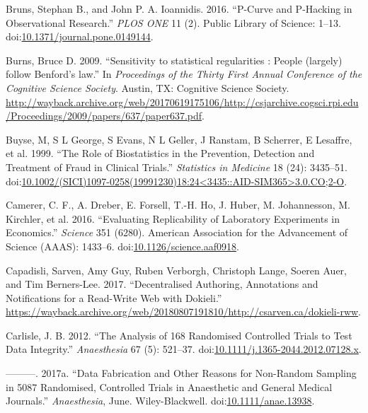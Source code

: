 \documentclass[a5paper]{book}
\begin{document}
\hypertarget{ref-doi:10.1371ux2fjournal.pone.0149144}{}
Bruns, Stephan B., and John P. A. Ioannidis. 2016. ``P-Curve and
P-Hacking in Observational Research.'' \emph{PLOS ONE} 11 (2). Public
Library of Science: 1--13.
doi:\href{https://doi.org/10.1371/journal.pone.0149144}{10.1371/journal.pone.0149144}.

\hypertarget{ref-Burns2009}{}
Burns, Bruce D. 2009. ``Sensitivity to statistical regularities : People
(largely) follow Benford's law.'' In \emph{Proceedings of the Thirty
First Annual Conference of the Cognitive Science Society}. Austin, TX:
Cognitive Science Society.
\url{http://wayback.archive.org/web/20170619175106/http://csjarchive.cogsci.rpi.edu/Proceedings/2009/papers/637/paper637.pdf}.

\hypertarget{ref-buyse1999}{}
Buyse, M, S L George, S Evans, N L Geller, J Ranstam, B Scherrer, E
Lesaffre, et al. 1999. ``The Role of Biostatistics in the Prevention,
Detection and Treatment of Fraud in Clinical Trials.'' \emph{Statistics
in Medicine} 18 (24): 3435--51.
doi:\href{https://doi.org/10.1002/(SICI)1097-0258(19991230)18:24\%3C3435::AID-SIM365\%3E3.0.CO;2-O}{10.1002/(SICI)1097-0258(19991230)18:24\textless{}3435::AID-SIM365\textgreater{}3.0.CO;2-O}.

\hypertarget{ref-doi:10.1126ux2fscience.aaf0918}{}
Camerer, C. F., A. Dreber, E. Forsell, T.-H. Ho, J. Huber, M.
Johannesson, M. Kirchler, et al. 2016. ``Evaluating Replicability of
Laboratory Experiments in Economics.'' \emph{Science} 351 (6280).
American Association for the Advancement of Science (AAAS): 1433--6.
doi:\href{https://doi.org/10.1126/science.aaf0918}{10.1126/science.aaf0918}.

\hypertarget{ref-dokieli}{}
Capadisli, Sarven, Amy Guy, Ruben Verborgh, Christoph Lange, Soeren
Auer, and Tim Berners-Lee. 2017. ``Decentralised Authoring, Annotations
and Notifications for a Read-Write Web with Dokieli.''
\url{https://wayback.archive.org/web/20180807191810/http://csarven.ca/dokieli-rww}.

\hypertarget{ref-doi:10.1111ux2fj.1365-2044.2012.07128.x}{}
Carlisle, J. B. 2012. ``The Analysis of 168 Randomised Controlled Trials
to Test Data Integrity.'' \emph{Anaesthesia} 67 (5): 521--37.
doi:\href{https://doi.org/10.1111/j.1365-2044.2012.07128.x}{10.1111/j.1365-2044.2012.07128.x}.

\hypertarget{ref-doi:10.1111ux2fanae.13938}{}
---------. 2017a. ``Data Fabrication and Other Reasons for Non-Random
Sampling in 5087 Randomised, Controlled Trials in Anaesthetic and
General Medical Journals.'' \emph{Anaesthesia}, June. Wiley-Blackwell.
doi:\href{https://doi.org/10.1111/anae.13938}{10.1111/anae.13938}.
\end{document}
